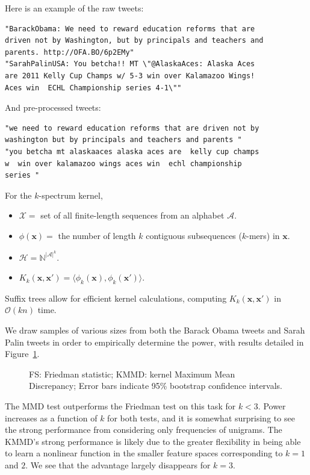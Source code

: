 Here is an example of the raw tweets:
\begin{verbatim}
"BarackObama: We need to reward education reforms that are
driven not by Washington, but by principals and teachers and
parents. http://OFA.BO/6p2EMy"
"SarahPalinUSA: You betcha!! MT \"@AlaskaAces: Alaska Aces
are 2011 Kelly Cup Champs w/ 5-3 win over Kalamazoo Wings!
Aces win  ECHL Championship series 4-1\""
\end{verbatim}
And pre-processed tweets:
\begin{verbatim}
"we need to reward education reforms that are driven not by
washington but by principals and teachers and parents "
"you betcha mt alaskaaces alaska aces are  kelly cup champs
w  win over kalamazoo wings aces win  echl championship
series "
\end{verbatim}

For the $k$-spectrum kernel,
\begin{itemize}
\item $\mathcal{X} = $ set of all finite-length sequences from an alphabet $\mathcal{A}$.
\item $\phi({\mathbf x}) = $ the number of length $k$ contiguous
  subsequences ($k$-mers) in ${\mathbf x}$.
\item $\mathcal{H} = \mathbb{N}^{|\mathcal{A}|^k}$.
\item $K_k({\mathbf x}, {\mathbf x}') = \langle \phi_k({\mathbf x}), \phi_k({\mathbf x}') \rangle$.
\end{itemize}

Suffix trees allow for efficient kernel calculations, computing
$K_k({\mathbf x}, {\mathbf x}')$ in
$\mathcal{O}(kn)$ time.

We draw samples of various sizes from
both the Barack Obama tweets and Sarah Palin tweets in order to
empirically determine the power, with results detailed in
Figure~\ref{fig:power_string}.

\begin{figure}
  \begin{center}
    \resizebox{14.0cm}{!}{
      
    }
  \end{center}
  \caption{FS: Friedman statistic; KMMD: kernel Maximum Mean
    Discrepancy; Error bars indicate 95\% bootstrap confidence
    intervals.}
  \label{fig:power_string}
\end{figure}

The MMD test outperforms the Friedman test on this task for $k < 3$.  Power
increases as a function of $k$ for both tests, and it is somewhat
surprising to see the strong performance from considering only
frequencies of unigrams.  The KMMD's strong performance is likely
due to the greater flexibility in being able to learn a nonlinear function
in the smaller feature spaces corresponding to $k = 1$ and $2$.  We see
that the advantage largely disappears for $k = 3$.

